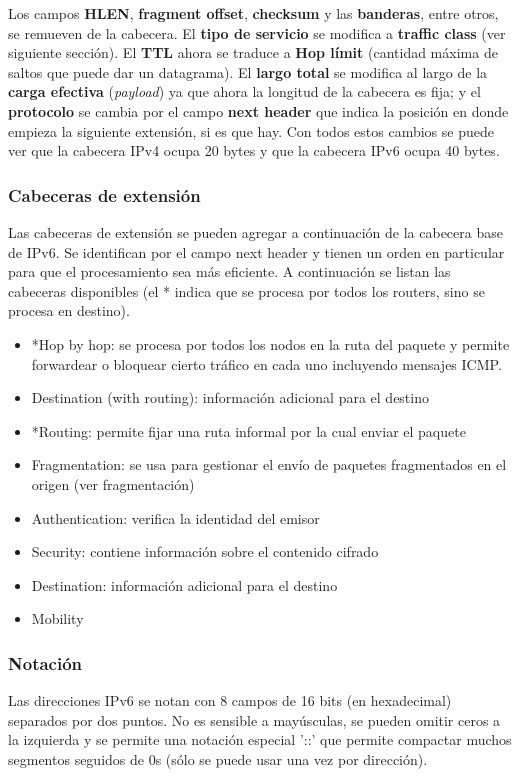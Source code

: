 \documentclass{book}
\begin{document}
	Los campos \textbf{HLEN}, \textbf{fragment offset}, \textbf{checksum} y las \textbf{banderas}, entre otros, se remueven de la cabecera. El \textbf{tipo de servicio} se modifica a \textbf{traffic class} (ver siguiente sección). El \textbf{TTL} ahora se traduce a \textbf{Hop límit} (cantidad máxima de saltos que puede dar un datagrama). El \textbf{largo total} se modifica al largo de la \textbf{carga efectiva} (\textit{payload}) ya que ahora la longitud de la cabecera es fija; y el \textbf{protocolo} se cambia por el campo \textbf{next header} que indica la posición en donde empieza la siguiente extensión, si es que hay. Con todos estos cambios se puede ver que la cabecera IPv4 ocupa 20 bytes y que la cabecera IPv6 ocupa 40 bytes.
	
	\subsubsection{Cabeceras de extensión}
	Las cabeceras de extensión se pueden agregar a continuación de la cabecera base de IPv6. Se identifican por el campo next header y tienen un orden en particular para que el procesamiento sea más eficiente. A continuación se listan las cabeceras disponibles (el * indica que se procesa por todos los routers, sino se procesa en destino).
	
	\begin{itemize}
		\item *Hop by hop: se procesa por todos los nodos en la ruta del paquete y permite forwardear o bloquear cierto tráfico en cada uno incluyendo mensajes ICMP.
		\item Destination (with routing): información adicional para el destino
		\item *Routing: permite fijar una ruta informal por la cual enviar el paquete
		\item Fragmentation: se usa para gestionar el envío de paquetes fragmentados en el origen (ver fragmentación)
		\item Authentication: verifica la identidad del emisor
		\item Security: contiene información sobre el contenido cifrado
		\item Destination: información adicional para el destino
		\item Mobility
	\end{itemize}
	
	\subsubsection{Notación}
	Las direcciones IPv6 se notan con 8 campos de 16 bits (en hexadecimal) separados por dos puntos. No es sensible a mayúsculas, se pueden omitir ceros a la izquierda y se permite una notación especial '::' que permite compactar muchos segmentos seguidos de 0s (sólo se puede usar una vez por dirección).
	
\end{document}
